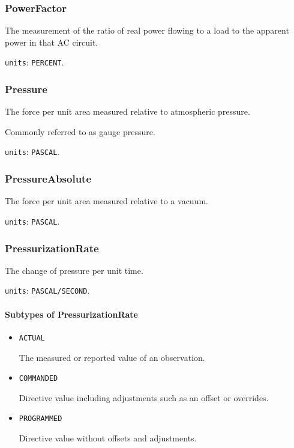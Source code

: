 \subsubsection{PowerFactor}
\label{sec:PowerFactor}



The measurement of the ratio of real power flowing to a load to the apparent power in that AC circuit.


\texttt{units}: \texttt{PERCENT}.


\subsubsection{Pressure}
\label{sec:Pressure}



The force per unit area measured relative to atmospheric pressure. 

Commonly referred to as gauge pressure.


\texttt{units}: \texttt{PASCAL}.


\subsubsection{PressureAbsolute}
\label{sec:PressureAbsolute}



The force per unit area measured relative to a vacuum.


\texttt{units}: \texttt{PASCAL}.


\subsubsection{PressurizationRate}
\label{sec:PressurizationRate}



The change of pressure per unit time.


\texttt{units}: \texttt{PASCAL/SECOND}.

\paragraph{Subtypes of PressurizationRate}\mbox{}
\label{sec:Subtypes of PressurizationRate}

\begin{itemize}

\item \texttt{ACTUAL}


The measured or reported value of an \gls{observation}.

\item \texttt{COMMANDED}


Directive value including adjustments such as an offset or overrides.

\item \texttt{PROGRAMMED}


Directive value without offsets and adjustments.


\end{itemize}






